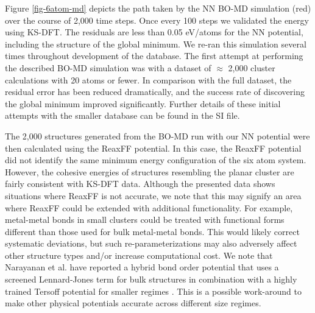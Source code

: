 \documentclass[12pt,oneside]{cmuthesis}
\begin{document}
Figure \ref{fig-6atom-md} depicts the path taken by the NN BO-MD simulation (red) over the course of 2,000 time steps. Once every 100 steps we validated the energy using KS-DFT. The residuals are less than 0.05 eV/atoms for the NN potential, including the structure of the global minimum. We re-ran this simulation several times throughout development of the database. The first attempt at performing the described BO-MD simulation was with a dataset of \(\approx\) 2,000 cluster calculations with 20 atoms or fewer. In comparison with the full dataset, the residual error has been reduced dramatically, and the success rate of discovering the global minimum improved significantly. Further details of these initial attempts with the smaller database can be found in the SI file.

The 2,000 structures generated from the BO-MD run with our NN potential were then calculated using the ReaxFF potential. In this case, the ReaxFF potential did not identify the same minimum energy configuration of the six atom system. However, the cohesive energies of structures resembling the planar cluster are fairly consistent with KS-DFT data. Although the presented data shows situations where ReaxFF is not accurate, we note that this may signify an area where ReaxFF could be extended with additional functionality. For example, metal-metal bonds in small clusters could be treated with functional forms different than those used for bulk metal-metal bonds. This would likely correct systematic deviations, but such re-parameterizations may also adversely affect other structure types and/or increase computational cost. We note that Narayanan et al. have reported a hybrid bond order potential that uses a screened Lennard-Jones term for bulk structures in combination with a highly trained Tersoff potential for smaller regimes \cite{narayanan-2016-descr-diver}. This is a possible work-around to make other physical potentials accurate across different size regimes.
\end{document}
